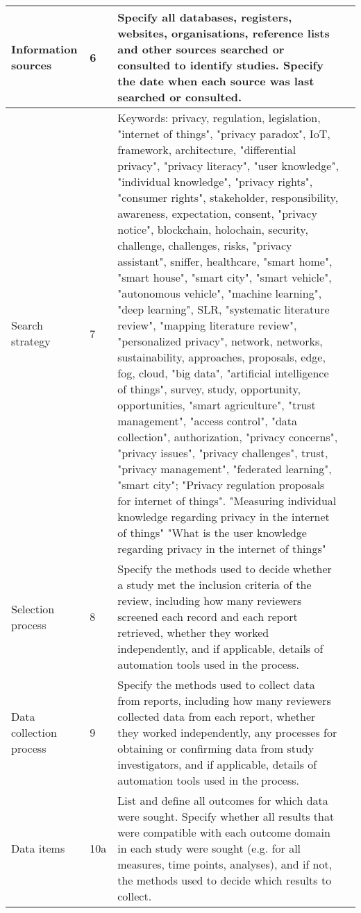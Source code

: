 \documentclass[landscape]{article}
\begin{document}
\begin{longtable}{|p{2.5cm}|p{0.5cm}|p{18cm}|p{3cm}|}
    Information sources & 6 & Specify all databases, registers, websites, organisations, reference lists and other sources searched or consulted to identify studies. Specify the date when each source was last searched or consulted. & \\
    \hline
    Search strategy & 7 & Keywords: privacy, regulation, legislation, "internet of things", "privacy paradox", IoT, framework, architecture, "differential privacy", "privacy literacy", "user knowledge", "individual knowledge", "privacy rights", "consumer rights", stakeholder, responsibility, awareness, expectation, consent, "privacy notice", blockchain, holochain, security, challenge, challenges, risks, "privacy assistant", sniffer, healthcare, "smart home", "smart house", "smart city", "smart vehicle", "autonomous vehicle", "machine learning", "deep learning", SLR, "systematic literature review", "mapping literature review", "personalized privacy", network, networks, sustainability, approaches, proposals, edge, fog, cloud, "big data", "artificial intelligence of things", survey, study, opportunity, opportunities, "smart agriculture", "trust management", "access control", "data collection", authorization, "privacy concerns", "privacy issues", "privacy challenges", trust, "privacy management", "federated learning", "smart city"; "Privacy regulation proposals for internet of things". "Measuring individual knowledge regarding privacy in the internet of things" "What is the user knowledge regarding privacy in the internet of things" & \\
    \hline
    Selection process & 8 &  Specify the methods used to decide whether a study met the inclusion criteria of the review, including how many reviewers screened each record and each report retrieved, whether they worked independently, and if applicable, details of automation tools used in the process. & \\
    \hline
    Data collection process & 9 &  Specify the methods used to collect data from reports, including how many reviewers collected data from each report, whether they worked independently, any processes for obtaining or confirming data from study investigators, and if applicable, details of automation tools used in the process. & \\
    \hline
    \multirow{2}{2.5cm}{Data items}& 10a & List and define all outcomes for which data were sought. Specify whether all results that were compatible with each outcome domain in each study were sought (e.g. for all measures, time points, analyses), and if not, the methods used to decide which results to collect.& \\

\end{longtable}
\end{document}
